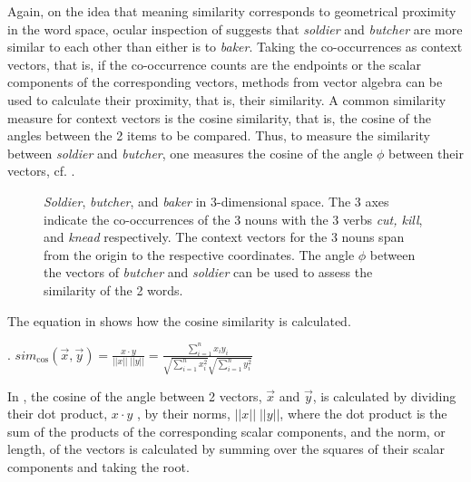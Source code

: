 Again, on the idea that meaning similarity corresponds to geometrical
proximity in the word space, ocular inspection of
 suggests that \emph{soldier} and
\emph{butcher} are more similar to each other than either is to
\emph{baker}. Taking the co-occurrences as context vectors, that is, if
the co-occurrence counts are the endpoints or the scalar components of the corresponding vectors,
methods from vector algebra can be used to calculate their proximity,
that is, their similarity. A common similarity measure for context vectors is the
cosine similarity, that is, the cosine of the angles between the 2
items to be compared. Thus, to measure the similarity between
\emph{soldier} and \emph{butcher}, one measures the cosine of the angle $\phi$
between their vectors,
cf. . 

\begin{figure}
  \centering
{}
  \caption{\emph{Soldier}, \emph{butcher}, and \emph{baker} in 3-dimensional
    space. The 3 axes indicate the co-occurrences of the 3 nouns with the 3 verbs
    \emph{cut, kill}, and \emph{knead} respectively. The context vectors for the 3 nouns span from the origin to the respective coordinates. The angle $\phi$ between the vectors of \emph{butcher} and \emph{soldier} can be used to assess the similarity of the 2 words.}

  \label{fig:soldiers3d}

\end{figure}

The equation in \Next shows how the cosine similarity is calculated.

\ex. %
\( \displaystyle 
sim_{\text{cos}}(\vec{x}, \vec{y}) = \frac{x \cdot y}{||x||\;||y||} =
\frac{\sum_{i=1}^{n} x_i y_i}
{\sqrt{\sum_{i=1}^{n} x_i^2}\sqrt{\sum_{i=1}^{n} y_i^2}} \)

\enlargethispage{1\baselineskip}
In \Last, the cosine of the angle between 2 vectors, $\vec{x}$ and $\vec{y}$, is calculated
by dividing their dot product, $x \cdot y$ ,  by their norms, $||x||\;||y||$, where the dot product is
the sum of the products of the corresponding scalar components, and
the norm, or length, of the vectors is calculated by summing over the
squares of their scalar components and taking the root.

